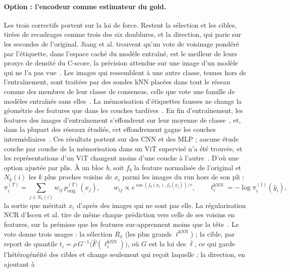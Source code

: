 \documentclass[11pt,a4paper]{article}
\newcommand{\orig}{\mathrm{orig}}
\begin{document}
\paragraph{Option : l'encodeur comme estimateur du gold.} Les trois correctifs portent sur la loi de
force. Restent la sélection et les cibles, tirées de recadrages comme trois des six doublures, et la
direction, qui parie sur les secondes de l'original. Jiang et al. trouvent qu'un vote de voisinage
pondéré par l'étiquette, dans l'espace caché du modèle entraîné, est le meilleur de leurs proxys de
densité du C-score, la précision attendue sur une image d'un modèle qui ne l'a pas
vue~\cite{jiang2021cscore}. Les images qui ressemblent à une autre classe, tenues hors de
l'entraînement, sont traitées par des sondes kNN placées dans tout le réseau comme des membres de
leur classe de consensus, celle que vote une famille de modèles entraînés sans
elles~\cite{baldock2021difficulty}. La
mémorisation d'étiquettes fausses ne change la géométrie des features que dans les couches
tardives~\cite{stephenson2021geometry}. En fin d'entraînement, les features des images d'entraînement
s'effondrent sur leur moyenne de classe~\cite{papyan2020collapse}, et, dans la plupart des réseaux
étudiés, cet effondrement gagne les couches intermédiaires~\cite{rangamani2023intermediate}. Ces résultats portent sur des CNN et des
MLP ; aucune étude couche par couche de la mémorisation dans un ViT supervisé n'a été trouvée, et les
représentations d'un ViT changent moins d'une couche à l'autre~\cite{raghu2021vit}. D'où une option
ajustée par plis. À un bloc $b$, soit $f_b$ la feature normalisée de l'original et $N_k(i)$ les $k$
plus proches voisins de $x_i$ parmi les images du run hors de son pli :
\begin{equation}\label{eq:v51knn}
  \pi^{(T)}_i=\sum_{j\in N_k(i)}w_{ij}\,p^{(T)}_\orig(x_j),\qquad
  w_{ij}\propto e^{\cos(f_b(x_i),f_b(x_j))/\tau},\qquad
  \ell^{\text{kNN}}_i=-\log\pi^{(1)}_i(\hat y_i),
\end{equation}
la sortie que méritait $x_i$ d'après des images qui ne sont pas elle. La régularisation NCR d'Iscen et
al. tire de même chaque prédiction vers celle de ses voisins en features, sur la prémisse que les
features sur-apprennent moins que la tête~\cite{iscen2022ncr}. Le vote donne trois usages : la
sélection $R_\phi$ (les plus grands $\ell^{\text{kNN}}$) ; la cible, par report de quantile
$t_i=\rho\,G^{-1}\bigl(\hat F(\ell^{\text{kNN}}_i)\bigr)$, où $G$ est la loi des $\bar\ell$, ce qui garde
l'hétérogénéité des cibles et change seulement qui reçoit laquelle ; la direction, en ajoutant à
\end{document}
